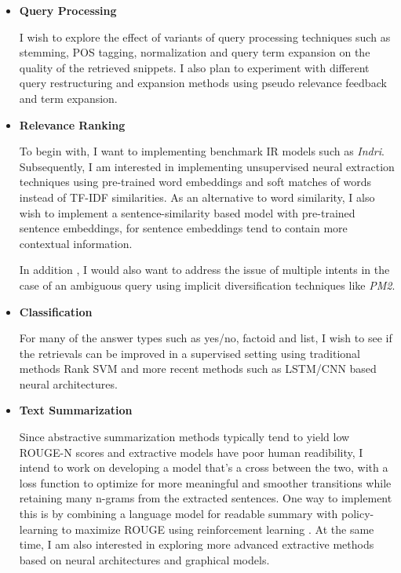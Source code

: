 \documentclass{article}
\begin{document}
\begin{itemize}
\item \textbf{Query Processing}

I wish to explore the effect of variants of query processing techniques such as stemming, POS tagging, normalization and query term expansion on the quality of the retrieved snippets. I also plan to experiment with different query restructuring and expansion methods using pseudo relevance feedback and term expansion.

\item \textbf{Relevance Ranking}

To begin with, I want to implementing benchmark IR models such as \textit{Indri}. Subsequently, I am interested in implementing unsupervised neural extraction techniques using pre-trained word embeddings and soft matches of words instead of TF-IDF similarities. As an alternative to word similarity, I also wish to implement a sentence-similarity based model with pre-trained sentence embeddings, for sentence embeddings tend to contain more contextual information.

In addition , I would also want to address the issue of multiple intents in the case of an ambiguous query using implicit diversification techniques like \textit{PM2}.

\item \textbf{Classification}

For many of the answer types such as yes/no, factoid and list, I wish to see if the retrievals can be improved in a supervised setting using traditional methods Rank SVM and more recent methods such as LSTM/CNN based neural architectures.

\item \textbf{Text Summarization}

Since abstractive summarization methods typically tend to yield low ROUGE-N scores and extractive models have poor human readibility, I intend to work on developing a model that's a cross between the two, with a loss function to optimize for more meaningful and smoother transitions while retaining many n-grams from the extracted sentences. One way to implement this is by combining a language model for readable summary with policy-learning to maximize ROUGE using reinforcement learning \cite{DBLP}. At the same time, I am also interested in exploring more advanced extractive methods based on neural architectures and graphical models.

\end{itemize}
\end{document}
